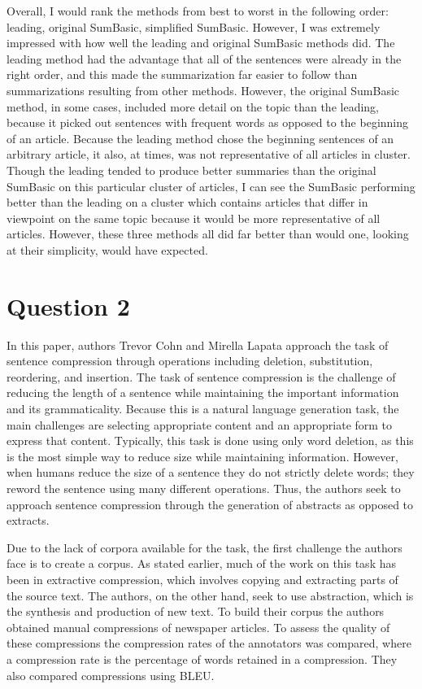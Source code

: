 \documentclass{article}
\begin{document}
Overall, I would rank the methods from best to worst in the following order: leading, original SumBasic, simplified SumBasic.  However, I was extremely impressed with how well the leading and original SumBasic methods did.  The leading method had the advantage that all of the sentences were already in the right order, and this made the summarization far easier to follow than summarizations resulting from other methods.  However, the original SumBasic method, in some cases, included more detail on the topic than the leading, because it picked out sentences with frequent words as opposed to the beginning of an article.  Because the leading method chose the beginning sentences of an arbitrary article, it also, at times, was not representative of all articles in cluster.  Though the leading tended to produce better summaries than the original SumBasic on this particular cluster of articles, I can see the SumBasic performing better than the leading on a cluster which contains articles that differ in viewpoint on the same topic because it would be more representative of all articles.  However, these three methods all did far better than would one, looking at their simplicity, would have expected.
\section*{Question 2}
  In this paper, authors Trevor Cohn and Mirella Lapata approach the task of sentence compression through operations including deletion, substitution, reordering, and insertion.  The task of sentence compression is the challenge of reducing the length of a sentence while maintaining the important information and its grammaticality.  Because this is a natural language generation task, the main challenges are selecting appropriate content and an appropriate form to express that content. Typically, this task is done using only word deletion, as this is the most simple way to reduce size while maintaining information.  However, when humans reduce the size of a sentence they do not strictly delete words; they reword the sentence using many different operations.  Thus, the authors seek to approach sentence compression through the generation of abstracts as opposed to extracts.
  
  Due to the lack of corpora available for the task, the first challenge the authors face is to create a corpus.  As stated earlier, much of the work on this task has been in extractive compression, which involves copying and extracting parts of the source text.  The authors, on the other hand, seek to use abstraction, which is the synthesis and production of new text.  To build their corpus the authors obtained manual compressions of newspaper articles.  To assess the quality of these compressions the compression rates of the annotators was compared, where a compression rate is the percentage of words retained in a compression.  They also compared compressions using BLEU.  
  
\end{document}
